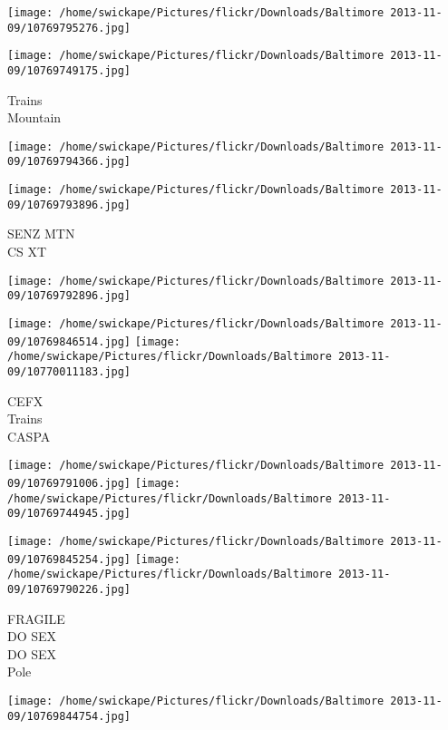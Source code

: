 \documentclass[10pt,letterpaper]{article}
\begin{document}
\texttt{[image: /home/swickape/Pictures/flickr/Downloads/Baltimore 2013-11-09/10769795276.jpg]}

\vspace{0.25in}
\texttt{[image: /home/swickape/Pictures/flickr/Downloads/Baltimore 2013-11-09/10769749175.jpg]}

Trains\\
Mountain\\
\pagebreak

\texttt{[image: /home/swickape/Pictures/flickr/Downloads/Baltimore 2013-11-09/10769794366.jpg]}

\vspace{0.25in}
\texttt{[image: /home/swickape/Pictures/flickr/Downloads/Baltimore 2013-11-09/10769793896.jpg]}

SENZ MTN\\
CS XT\\
\pagebreak

\texttt{[image: /home/swickape/Pictures/flickr/Downloads/Baltimore 2013-11-09/10769792896.jpg]}

\vspace{0.25in}
\texttt{[image: /home/swickape/Pictures/flickr/Downloads/Baltimore 2013-11-09/10769846514.jpg]}
\texttt{[image: /home/swickape/Pictures/flickr/Downloads/Baltimore 2013-11-09/10770011183.jpg]}

CEFX\\
Trains\\
CASPA\\
\pagebreak

\texttt{[image: /home/swickape/Pictures/flickr/Downloads/Baltimore 2013-11-09/10769791006.jpg]}
\texttt{[image: /home/swickape/Pictures/flickr/Downloads/Baltimore 2013-11-09/10769744945.jpg]}

\texttt{[image: /home/swickape/Pictures/flickr/Downloads/Baltimore 2013-11-09/10769845254.jpg]}
\texttt{[image: /home/swickape/Pictures/flickr/Downloads/Baltimore 2013-11-09/10769790226.jpg]}

FRAGILE\\
DO SEX\\
DO SEX\\
Pole\\
\pagebreak

\texttt{[image: /home/swickape/Pictures/flickr/Downloads/Baltimore 2013-11-09/10769844754.jpg]}
\end{document}
